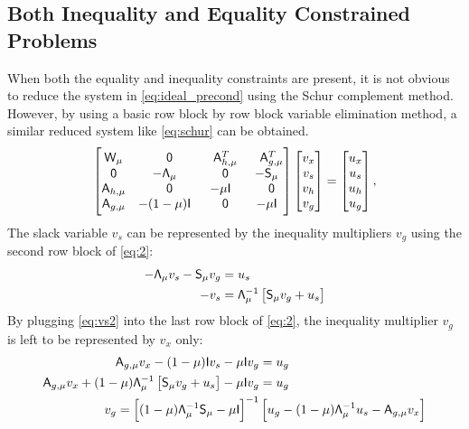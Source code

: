\subsection{Both Inequality and Equality Constrained Problems}
When both the equality and inequality constraints are present, it is not obvious to reduce the system in 
\eqref{eq:ideal_precond} using the Schur complement method. However, by using a basic row block by 
row block variable elimination method, a similar reduced system like \eqref{eq:schur} can be obtained. 
\begin{equation}\label{eq:2}
  \begin{bmatrix} 
	\mathsf{W}_\mu & \phantom{-}\mathsf{0} & \phantom{-}\mathsf{A}_{h,\mu}^T  & \phantom{-}\mathsf{A}_{g,\mu}^T \\
	\mathsf{0}  & -\mathsf{\Lambda}_\mu & \phantom{-}\mathsf{0}   & -\mathsf{S}_\mu \\
	\mathsf{A}_{h, \mu} & \phantom{-}\mathsf{0} &  -\mu \mathsf{I} & \phantom{-}\mathsf{0}  \\
	\mathsf{A}_{g, \mu} &  -(1-\mu)\mathsf{I} &  \phantom{-}\mathsf{0}     &   -\mu \mathsf{I}
\end{bmatrix}
\begin{bmatrix} v_x \\ v_s \\ v_{h} \\  v_{g} \end{bmatrix} 
= 
\begin{bmatrix} u_x \\ u_s \\ u_{h} \\ u_{g}  \end{bmatrix},
\end{equation}
The slack variable $v_s$ can be represented by the inequality multipliers $v_g$ using 
the second row block of \eqref{eq:2}: 
\begin{align}
 -\mathsf{\Lambda}_\mu  v_s  - \mathsf{S}_\mu v_g  &= u_s  \notag \\
   -v_s &=   \mathsf{\Lambda}_\mu ^{-1} \left[ \mathsf{S}_\mu v_g + u_s  \right]  
 \label{eq:vs2}
\end{align}
By plugging \eqref{eq:vs2} into the last row block of \eqref{eq:2}, the inequality multiplier $v_g$ is 
left to be represented by $v_x$ only: 
\begin{align}
\mathsf{A}_{g,\mu} v_x -(1-\mu)\mathsf{I} v_s -\mu \mathsf{I} v_g  &= u_g  \notag \\
\mathsf{A}_{g,\mu} v_x   +  (1-\mu)   \mathsf{\Lambda}_\mu ^{-1} \left[ \mathsf{S}_\mu v_g + u_s  \right] -\mu \mathsf{I} v_g &= u_g  \notag  \\
 v_g = \left[ (1-\mu)   \mathsf{\Lambda}_\mu ^{-1} \mathsf{S}_\mu   -\mu \mathsf{I} \right]^{-1} & \left[   u_g -    (1-\mu)   \mathsf{\Lambda}_\mu ^{-1} u_s  -   \mathsf{A}_{g,\mu} v_x   \right] 
 \label{eq:vg2x}
\end{align}
